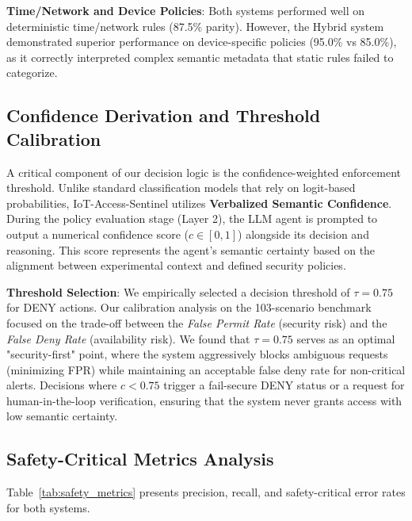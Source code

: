 \documentclass[conference]{IEEEtran}
\begin{document}
\textbf{Time/Network and Device Policies}: Both systems performed well on deterministic time/network rules (87.5\% parity). However, the Hybrid system demonstrated superior performance on device-specific policies (95.0\% vs 85.0\%), as it correctly interpreted complex semantic metadata that static rules failed to categorize.

\subsection{Confidence Derivation and Threshold Calibration}

A critical component of our decision logic is the confidence-weighted enforcement threshold. Unlike standard classification models that rely on logit-based probabilities, IoT-Access-Sentinel utilizes \textbf{Verbalized Semantic Confidence}. During the policy evaluation stage (Layer 2), the LLM agent is prompted to output a numerical confidence score ($c \in [0, 1]$) alongside its decision and reasoning. This score represents the agent's semantic certainty based on the alignment between experimental context and defined security policies.

\textbf{Threshold Selection}: We empirically selected a decision threshold of $\tau = 0.75$ for DENY actions. Our calibration analysis on the 103-scenario benchmark focused on the trade-off between the \textit{False Permit Rate} (security risk) and the \textit{False Deny Rate} (availability risk). We found that $\tau = 0.75$ serves as an optimal "security-first" point, where the system aggressively blocks ambiguous requests (minimizing FPR) while maintaining an acceptable false deny rate for non-critical alerts. Decisions where $c < 0.75$ trigger a fail-secure DENY status or a request for human-in-the-loop verification, ensuring that the system never grants access with low semantic certainty.

\subsection{Safety-Critical Metrics Analysis}

Table~\ref{tab:safety_metrics} presents precision, recall, and safety-critical error rates for both systems.
\end{document}
